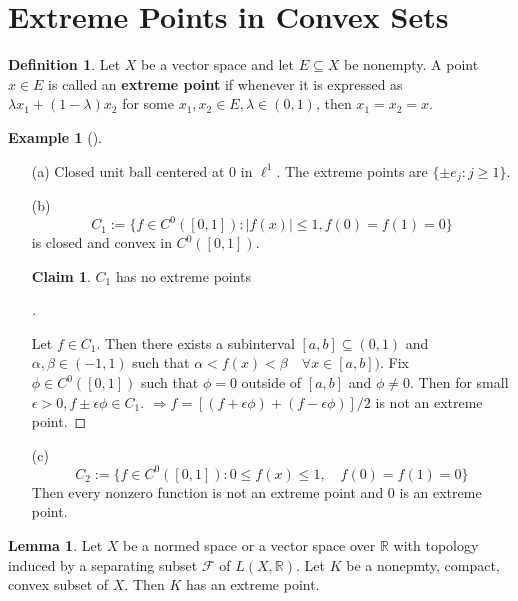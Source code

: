 \documentclass{article}
\theoremstyle{definition}
\newtheorem{ex}{Example}
\newtheorem{lem}{Lemma}
\newtheorem{dfn}{Definition}
\newtheorem*{clm}{Claim}
\newenvironment{proofs}[1][\proofname]{%
  \begin{proof}[#1]$ $\par\nobreak\ignorespaces
}{%
  \end{proof}
}
\newenvironment{exs}[1][]{%
  \begin{ex}[#1]$ $\par\nobreak\ignorespaces
}{%
  \end{ex}
}
\newcommand{\F}{\mathcal F}
\newcommand{\RR}{\mathbb R}
\newcommand{\Ra}{\Rightarrow}
\begin{document}
\section{Extreme Points in Convex Sets}

\begin{dfn}
	Let $X$ be a vector space and let $E \subseteq X$ be nonempty.
	A point $x \in E$ is called an \textbf{extreme point} if whenever it is expressed as $\lambda x_1 + (1 - \lambda) x_2$ for some $x_1, x_2 \in E, \lambda \in (0, 1)$, then $x_1 = x_2 = x$.	
\end{dfn}

\begin{exs}
	\begin{enumerate}
		\item[(a)] Closed unit ball centered at 0 in $\ell^1$.
			The extreme points are $\{\pm e_j: j \geq 1\}$.

		\item[(b)] 
			\[
				C_1 := \{ f \in C^0([0, 1]): |f(x)| \leq 1, f(0) = f(1) = 0\}
			\]
			is closed and convex in $C^0([0, 1])$.
			\begin{clm}
				$C_1$ has no extreme points
			\end{clm}
			\begin{proofs}
				Let $f \in C_1$.
				Then there exists a subinterval $[a, b] \subseteq (0, 1)$ and $\alpha, \beta \in (-1, 1)$ such that $\alpha < f(x) < \beta \quad \forall x \in [a, b])$.
				Fix $\phi \in C^0([0, 1])$ such that $\phi = 0$ outside of $[a, b]$ and $\phi \neq 0$.
				Then for small $\epsilon > 0, f \pm \epsilon \phi \in C_1$.
				$\Ra f = [(f + \epsilon \phi) + (f - \epsilon \phi)]/2$ is not an extreme point.
			\end{proofs}

		\item[(c)] 
			\[
				C_2 := \{f \in C^0([0, 1]): 0 \leq f(x) \leq 1, \quad f(0) = f(1) = 0\}
			\]
			Then every nonzero function is not an extreme point and 0 is an extreme point.
	\end{enumerate}
\end{exs}

\begin{lem}
	Let $X$ be a normed space or a vector space over $\RR$ with topology induced by a separating subset $\F$ of $L(X, \RR)$.
	Let $K$ be a nonepmty, compact, convex subset of $X$.
	Then $K$ has an extreme point.
\end{lem}
\end{document}

